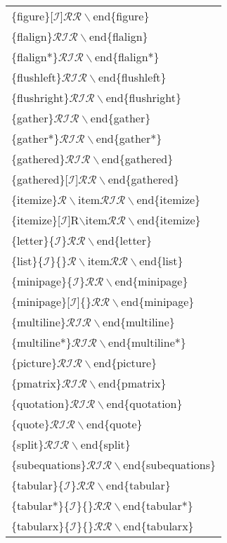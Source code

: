 \begin{longtable}{p{100mm}}
\{figure\}[$\mathcal{I}$]$\mathcal{RR}\backslash$end\{figure\}\\
\{flalign\}$\mathcal{RIR}\backslash$end\{flalign\}\\
\{flalign*\}$\mathcal{RIR}\backslash$end\{flalign*\}\\
\{flushleft\}$\mathcal{RIR}\backslash$end\{flushleft\}\\
\{flushright\}$\mathcal{RIR}\backslash$end\{flushright\}\\
\{gather\}$\mathcal{RIR}\backslash$end\{gather\}\\
\{gather*\}$\mathcal{RIR}\backslash$end\{gather*\}\\
\{gathered\}$\mathcal{RIR}\backslash$end\{gathered\}\\
\{gathered\}[$\mathcal{I}$]$\mathcal{RR}\backslash$end\{gathered\}\\
\{itemize\}$\mathcal{R}\backslash$item$\mathcal{RIR}\backslash$end\{itemize\}\\
\{itemize\}[$\mathcal{I}$]R$\backslash$item$\mathcal{RR}\backslash$end\{itemize\}\\
\{letter\}\{$\mathcal{I}$\}$\mathcal{RR}\backslash$end\{letter\}\\
\{list\}\{$\mathcal{I}$\}\{\}$\mathcal{R}\backslash$item$\mathcal{RR}\backslash$end\{list\}\\
\{minipage\}\{$\mathcal{I}$\}$\mathcal{RR}\backslash$end\{minipage\}\\
\{minipage\}[$\mathcal{I}$]\{\}$\mathcal{RR}\backslash$end\{minipage\}\\
\{multiline\}$\mathcal{RIR}\backslash$end\{multiline\}\\
\{multiline*\}$\mathcal{RIR}\backslash$end\{multiline*\}\\
\{picture\}$\mathcal{RIR}\backslash$end\{picture\}\\
\{pmatrix\}$\mathcal{RIR}\backslash$end\{pmatrix\}\\
\{quotation\}$\mathcal{RIR}\backslash$end\{quotation\}\\
\{quote\}$\mathcal{RIR}\backslash$end\{quote\}\\
\{split\}$\mathcal{RIR}\backslash$end\{split\}\\
\{subequations\}$\mathcal{RIR}\backslash$end\{subequations\}\\
\{tabular\}\{$\mathcal{I}$\}$\mathcal{RR}\backslash$end\{tabular\}\\
\{tabular*\}\{$\mathcal{I}$\}\{\}$\mathcal{RR}\backslash$end\{tabular*\}\\
\{tabularx\}\{$\mathcal{I}$\}\{\}$\mathcal{RR}\backslash$end\{tabularx\}\\

\end{longtable}
